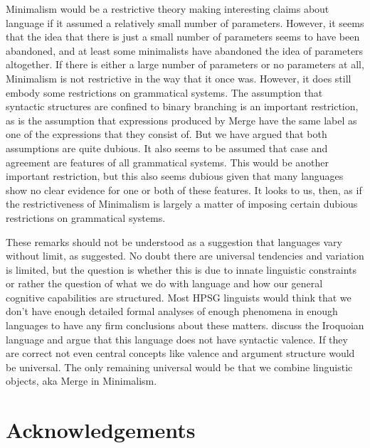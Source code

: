 \documentclass[output=paper]{langsci/langscibook}
\begin{document}
Minimalism would be a restrictive theory making interesting claims about language if it assumed a
relatively small number of parameters. However, it seems that the idea that there is just a small
number of parameters seems to have been abandoned, and at least some minimalists have abandoned the
idea of parameters altogether. If there is either a large number of parameters or no parameters at
all, Minimalism is not restrictive in the way that it once was. However, it does still embody some
restrictions on grammatical systems. The assumption that syntactic structures are confined to binary
branching is an important restriction, as is the assumption that expressions produced by Merge have
the same label as one of the expressions that they consist of. But we have argued that both
assumptions are quite dubious. It also seems to be assumed that case and agreement are features of
all grammatical systems. This would be another important restriction, but this also seems dubious
given that many languages show no clear evidence for one or both of these features. It looks to us,
then, as if the restrictiveness of Minimalism is largely a matter of imposing certain dubious
restrictions on grammatical systems.

These remarks should not be understood as a suggestion that languages vary without limit, as
\citet[]{Joos58a} suggested. No doubt there are universal tendencies and variation
is limited, but the question is whether this is due to innate linguistic constraints or rather the
question of what we do with language and how our general cognitive capabilities are structured. 
Most HPSG linguists would think that we don’t have enough detailed formal
analyses of enough phenomena in enough languages to have any firm conclusions about these
matters. \citet{KM2012a} discuss the Iroquoian language  and argue that this language
does not have syntactic valence. If they are correct not even central concepts like valence and
argument structure would be universal. The only remaining universal would be that we combine
linguistic objects, aka Merge in Minimalism.


\section*{Acknowledgements}
\end{document}
